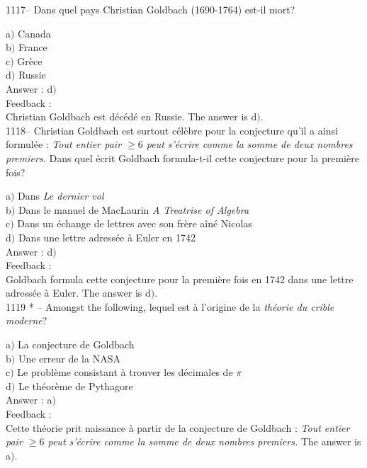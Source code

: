 \documentclass[letterpaper, 12pt]{article}
\begin{document}
1117-- Dans quel pays Christian Goldbach (1690-1764) est-il mort?

a$)$ Canada \\
b$)$ France  \\
c$)$ Gr\`ece \\
d$)$ Russie \\

Answer : d$)$\\

Feedback : \\
Christian Goldbach est d\'ec\'ed\'e en Russie. The answer is d$)$.\\

1118-- Christian Goldbach est surtout c\'el\`ebre pour la conjecture
qu'il a ainsi formul\'ee : {\sl Tout entier pair $\ge6$ peut
s'\'ecrire comme la somme de deux nombres premiers.} Dans quel
\'ecrit Goldbach formula-t-il cette conjecture pour la premi\`ere
fois?

a$)$ Dans {\sl Le dernier vol} \\
b$)$ Dans le manuel de MacLaurin {\sl A Treatrise of Algebra} \\
c$)$ Dans un \'echange de lettres avec son fr\`ere a\^in\'e Nicolas \\
d$)$ Dans une lettre adress\'ee \`a Euler en 1742 \\

Answer : d$)$\\

Feedback : \\
Goldbach formula cette conjecture pour la premi\`ere fois en 1742 dans une
lettre adress\'ee \`a Euler. The answer is d$)$.\\

1119 * -- Amongst the following, lequel est \`a
l'origine de la {\sl th\'eorie du crible moderne}?

a$)$ La conjecture de Goldbach \\
b$)$ Une erreur de la NASA  \\
c$)$ Le probl\`eme consistant \`a trouver les d\'ecimales de $\pi$ \\
d$)$ Le th\'eor\`eme de Pythagore \\

Answer : a$)$\\

Feedback : \\
Cette th\'eorie prit naissance \`a partir de la conjecture de
Goldbach : {\sl Tout entier pair $\ge6$ peut s'\'ecrire comme la
somme de deux nombres premiers.}
The answer is a$)$.\\
\end{document}
